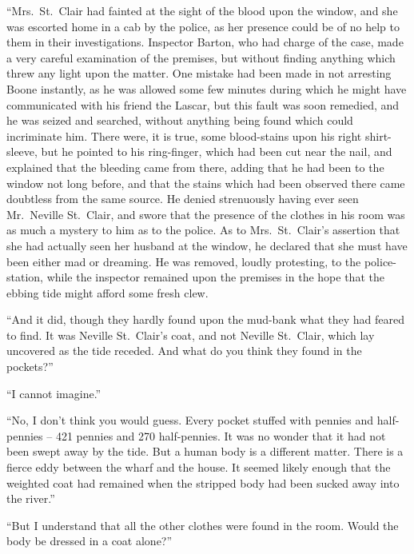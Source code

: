 “Mrs.~St.~Clair had fainted at the sight of the blood upon
the window, and she was escorted home in a cab by the police,
as her presence could be of no help to them in their investigations.
Inspector Barton, who had charge of the case,
made a very careful examination of the premises, but without
finding anything which threw any light upon the matter. One
mistake had been made in not arresting Boone instantly, as
he was allowed some few minutes during which he might have
communicated with his friend the Lascar, but this fault was
soon remedied, and he was seized and searched, without anything
being found which could incriminate him. There were,
it is true, some blood-stains upon his right shirt-sleeve, but he
pointed to his ring-finger, which had been cut near the nail,
and explained that the bleeding came from there, adding that
he had been to the window not long before, and that the stains
which had been observed there came doubtless from the same
source. He denied strenuously having ever seen Mr.~Neville
St.~Clair, and swore that the presence of the clothes in his
room was as much a mystery to him as to the police. As to
Mrs.~St.~Clair’s assertion that she had actually seen her husband
at the window, he declared that she must have been either
mad or dreaming. He was removed, loudly protesting, to the
police-station, while the inspector remained upon the premises
in the hope that the ebbing tide might afford some fresh clew.

“And it did, though they hardly found upon the mud-bank
what they had feared to find. It was Neville St.~Clair’s coat,
and not Neville St.~Clair, which lay uncovered as the tide receded.
And what do you think they found in the pockets?”

“I cannot imagine.”

“No, I don’t think you would guess. Every pocket stuffed
with pennies and half-pennies -- 421 pennies and 270 half-pennies.
It was no wonder that it had not been swept away
by the tide. But a human body is a different matter. There
is a fierce eddy between the wharf and the house. It seemed
likely enough that the weighted coat had remained when the
stripped body had been sucked away into the river.”

“But I understand that all the other clothes were found in
the room. Would the body be dressed in a coat alone?”

